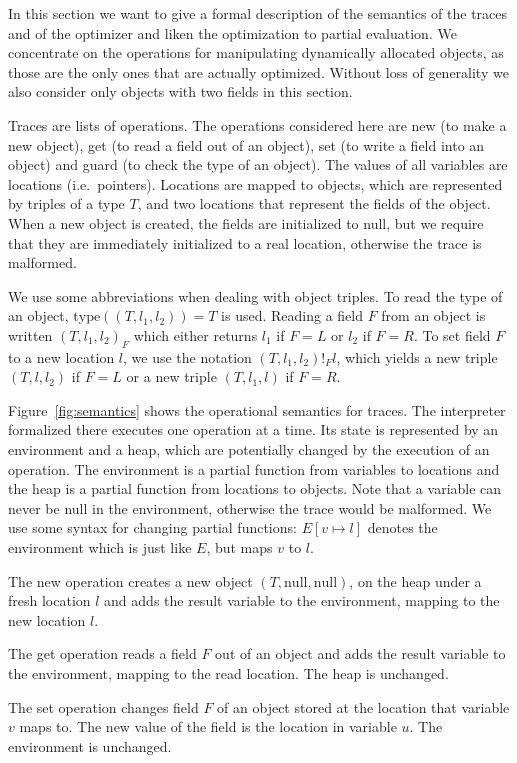 \documentclass{sigplanconf}
\begin{document}
In this section we want to give a formal description of the semantics of the
traces and of the optimizer and liken the optimization to partial evaluation.
We concentrate on the operations for manipulating dynamically allocated objects,
as those are the only ones that are actually optimized. Without loss of
generality we also consider only objects with two fields in this section.

Traces are lists of operations. The operations considered here are new (to make
a new object), get (to read a field out of an object), set (to write a field
into an object) and guard (to check the type of an object). The values of all
variables are locations (i.e.~pointers). Locations are mapped to objects, which
are represented by triples of a type $T$, and two locations that represent the
fields of the object. When a new object is created, the fields are initialized
to null, but we require that they are immediately initialized to a real
location, otherwise the trace is malformed.

We use some abbreviations when dealing with object triples. To read the type of
an object, $\mathrm{type}((T,l_1,l_2))=T$ is used. Reading a field $F$ from an
object is written $(T,l_1,l_2)_F$ which either returns $l_1$ if $F=L$ or $l_2$
if $F=R$. To set field $F$ to a new location $l$, we use the notation
$(T,l_1,l_2)!_Fl$, which yields a new triple $(T,l,l_2)$ if $F=L$ or a new
triple $(T,l_1,l)$ if $F=R$.

Figure~\ref{fig:semantics} shows the operational semantics for traces. The
interpreter formalized there executes one operation at a time. Its state is
represented by an environment and a heap, which are potentially changed by the
execution of an operation. The environment is a partial function from variables
to locations and the heap is a partial function from locations to objects. Note
that a variable can never be null in the environment, otherwise the trace would
be malformed. We use some syntax for changing partial functions: $E[v\mapsto l]$
denotes the environment which is just like $E$, but maps $v$ to $l$.

The new operation creates a new object $(T,\mathrm{null},\mathrm{null})$, on the
heap under a fresh location $l$ and adds the result variable to the environment,
mapping to the new location $l$.

The get operation reads a field $F$ out of an object and adds the result
variable to the environment, mapping to the read location. The heap is
unchanged.

The set operation changes field $F$ of an object stored at the location that
variable $v$ maps to. The new value of the field is the location in variable
$u$. The environment is unchanged.
\end{document}
